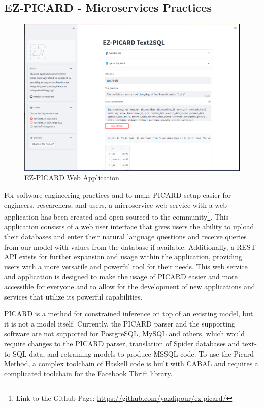 \subsection{EZ-PICARD - Microservices Practices}

\begin{figure}[h]
    \centering
    \includegraphics[width=1\textwidth]{pics/ez/ui.png}
    \caption{EZ-PICARD Web Application}
    \label{fig:ezpicard}
\end{figure}

For software engineering practices and to make PICARD setup easier for engineers, researchers, and users, a microservice web service with a web application has been created and open-sourced to the community\footnote[1]{Link to the Github Page: \url{https://github.com/yazdipour/ez-picard/}}. This application consists of a web user interface that gives users the ability to upload their databases and enter their natural language questions and receive queries from our model with values from the database if available. Additionally, a REST API exists for further expansion and usage within the application, providing users with a more versatile and powerful tool for their needs. This web service and application is designed to make the usage of PICARD easier and more accessible for everyone and to allow for the development of new applications and services that utilize its powerful capabilities.

PICARD is a method for constrained inference on top of an existing model, but it is not a model itself. Currently, the PICARD parser and the supporting software are not supported for PostgreSQL, MySQL and others, which would require changes to the PICARD parser, translation of Spider databases and text-to-SQL data, and retraining models to produce MSSQL code. To use the Picard Method, a complex toolchain of Haskell code is built with CABAL and requires a complicated toolchain for the Facebook Thrift library.


